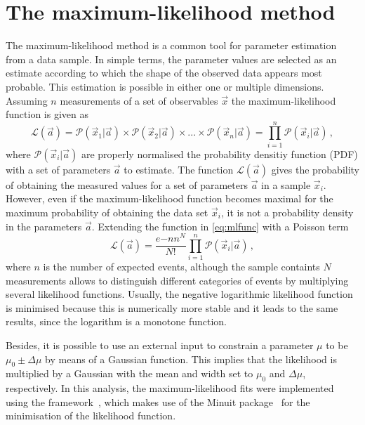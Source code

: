 \section{The maximum-likelihood method}
\label{sec:MLFit}

The maximum-likelihood method is a common tool for parameter estimation from a data sample.
In simple terms, the parameter values are selected as an estimate according to which the shape of the observed data appears most probable.
This estimation is possible in either one or multiple dimensions.
Assuming $n$ measurements of a set of observables $\vec{x}$ the maximum-likelihood function is given as
\begin{equation}
\mathcal{L}(\vec{a})=\mathcal{P}(\vec{x}_1|\vec{a})\times\mathcal{P}(\vec{x}_2|\vec{a})\times...\times\mathcal{P}(\vec{x}_n|\vec{a})=\prod_{i=1}^{n}\mathcal{P}(\vec{x}_i|\vec{a})\,,\label{eq:mlfunc}
\end{equation}
where $\mathcal{P}(\vec{x}_i|\vec{a})$ are properly normalised the probability densitiy function (PDF) with a set of parameters $\vec{a}$ to estimate.
The function $\mathcal{L}(\vec{a})$ gives the probability of obtaining the measured values for a set of parameters $\vec{a}$ in a sample $\vec{x}_i$.
However, even if the maximum-likelihood function becomes maximal for the maximum probability of obtaining the data set $\vec{x}_i$, it is not a probability density in the parameters $\vec{a}$.
Extending the function in \cref{eq:mlfunc} with a Poisson term
\begin{equation}
\mathcal{L}(\vec{a})=\frac{e{-n}n^N}{N!}\prod_{i=1}^{n}\mathcal{P}(\vec{x}_i|\vec{a})\,,
\end{equation}
where $n$ is the number of expected events, although the sample containts $N$ measurements allows to distinguish different categories of events by multiplying several likelihood functions.
Usually, the negative logarithmic likelihood function is minimised because this is numerically more stable and it leads to the same results, since the logarithm is a monotone function.

Besides, it is possible to use an external input to constrain a parameter $\mu$ to be $\mu_0\pm\Delta\mu$ by means of a Gaussian function.
This implies that the likelihood is multiplied by a Gaussian with the mean and width set to $\mu_0$ and $\Delta\mu$, respectively.
In this analysis, the maximum-likelihood fits were implemented using the \root framework~\cite{Antcheva:2009zz}, which makes use of the Minuit package~\cite{James:1975dr} for the minimisation of the likelihood function.


